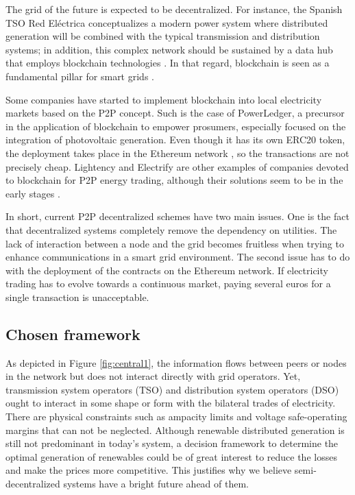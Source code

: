 The grid of the future is expected to be decentralized. For instance, the Spanish TSO Red Eléctrica conceptualizes a modern power system where distributed generation will be combined with the typical transmission and distribution systems; in addition, this complex network should be sustained by a data hub that employs blockchain technologies \cite{ree_datahub}. In that regard, blockchain is seen as a fundamental pillar for smart grids \cite{aderibole2020blockchain, alladi2019blockchain, musleh2019blockchain}. 

Some companies have started to implement blockchain into local electricity markets based on the P2P concept. Such is the case of PowerLedger, a precursor in the application of blockchain to empower prosumers, especially focused on the integration of photovoltaic generation. Even though it has its own ERC20 token, the deployment takes place in the Ethereum network \cite{power_ledger}, so the transactions are not precisely cheap. Lightency and Electrify are other examples of companies devoted to blockchain for P2P energy trading, although their solutions seem to be in the early stages \cite{lightency, electrify}. %

In short, current P2P decentralized schemes have two main issues. One is the fact that decentralized systems completely remove the dependency on utilities. The lack of interaction between a node and the grid becomes fruitless when trying to enhance communications in a smart grid environment. The second issue has to do with the deployment of the contracts on the Ethereum network. If electricity trading has to evolve towards a continuous market, paying several euros for a single transaction is unacceptable.


\subsection{Chosen framework} %
As depicted in Figure \ref{fig:central1}, the information flows between peers or nodes in the network but does not interact directly with grid operators. Yet, transmission system operators (TSO) and distribution system operators (DSO) ought to interact in some shape or form with the bilateral trades of electricity. There are physical constraints such as ampacity limits and voltage safe-operating margins that can not be neglected. Although renewable distributed generation is still not predominant in today's system, a decision framework to determine the optimal generation of renewables could be of great interest to reduce the losses and make the prices more competitive. This justifies why we believe semi-decentralized systems have a bright future ahead of them.

